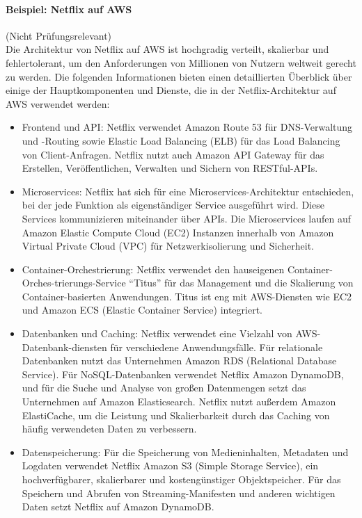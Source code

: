 \documentclass[../vs-script-first-v01.tex]{subfiles}
\begin{document}
\paragraph{Beispiel: Netflix auf AWS} (Nicht Prüfungsrelevant)\mbox{}\\
Die Architektur von Netflix auf AWS ist hochgradig verteilt, skalierbar und fehlertolerant, um den Anforderungen von Millionen von Nutzern weltweit gerecht zu werden. Die folgenden Informationen bieten einen detaillierten Überblick über einige der Hauptkomponenten und Dienste, die in der Netflix-Architektur auf AWS verwendet werden:
\begin{itemize}
\item Frontend und API: Netflix verwendet Amazon Route 53 für DNS-Verwaltung und -Routing sowie Elastic Load Balancing (ELB) für das Load Balancing von Client-Anfragen. Netflix nutzt auch Amazon API Gateway für das Erstellen, Veröffentlichen, Verwalten und Sichern von RESTful-APIs.
\item Microservices: Netflix hat sich für eine Microservices-Architektur entschieden, bei der jede Funktion als eigenständiger Service ausgeführt wird. Diese Services kommunizieren miteinander über APIs. Die Microservices laufen auf Amazon Elastic Compute Cloud (EC2) Instanzen innerhalb von Amazon Virtual Private Cloud (VPC) für Netzwerkisolierung und Sicherheit.
\item Container-Orchestrierung: Netflix verwendet den hauseigenen Container-Orches-trierungs-Service \enquote{Titus} für das Management und die Skalierung von Container-basierten Anwendungen. Titus ist eng mit AWS-Diensten wie EC2 und Amazon ECS (Elastic Container Service) integriert.
\item Datenbanken und Caching: Netflix verwendet eine Vielzahl von AWS-Datenbank-diensten für verschiedene Anwendungsfälle. Für relationale Datenbanken nutzt das Unternehmen Amazon RDS (Relational Database Service). Für NoSQL-Datenbanken verwendet Netflix Amazon DynamoDB, und für die Suche und Analyse von großen Datenmengen setzt das Unternehmen auf Amazon Elasticsearch. Netflix nutzt außerdem Amazon ElastiCache, um die Leistung und Skalierbarkeit durch das Caching von häufig verwendeten Daten zu verbessern.
\item Datenspeicherung: Für die Speicherung von Medieninhalten, Metadaten und Logdaten verwendet Netflix Amazon S3 (Simple Storage Service), ein hochverfügbarer, skalierbarer und kostengünstiger Objektspeicher. Für das Speichern und Abrufen von Streaming-Manifesten und anderen wichtigen Daten setzt Netflix auf Amazon DynamoDB.

\end{itemize}
\end{document}
